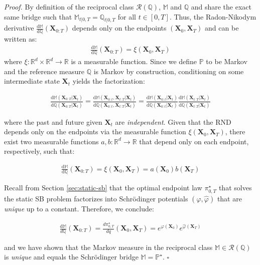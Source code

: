 \documentclass{article}
\begin{document}
\textit{Proof.} By definition of the reciprocal class $\mathcal{R}(\mathbb{Q})$, $\mathbb{M}$ and $\mathbb{Q}$ and share the exact same bridge such that $\mathbb{M}_{t|0,T}=\mathbb{Q}_{t|0,T}$ for all $t\in [0,T]$. Thus, the Radon-Nikodym derivative $\frac{\mathrm{d}\mathbb{M}}{\mathrm{d}\mathbb{Q}}(\boldsymbol{X}_{0:T})$ depends only on the endpoints $(\boldsymbol{X}_0, \boldsymbol{X}_T)$ and can be written as:
\begin{align}
    \frac{\mathrm{d}\mathbb{M}}{\mathrm{d}\mathbb{Q}}(\boldsymbol{X}_{0:T})=\xi(\boldsymbol{X}_0, \boldsymbol{X}_T)
\end{align}
where $\xi:\mathbb{R}^d\times\mathbb{R}^d\to \mathbb{R}$ is a measurable function. Since we define $\mathbb{P}$ to be Markov and the reference measure $\mathbb{Q}$ is Markov by construction, conditioning on some intermediate state $\boldsymbol{X}_t$ yields the factorization:
\begin{small}
\begin{align}
    \frac{\mathrm{d}\mathbb{M}(\boldsymbol{X}_{0:T}|\boldsymbol{X}_t)}{\mathrm{d}\mathbb{Q}(\boldsymbol{X}_{0:T}|\boldsymbol{X}_t)}=\frac{\mathrm{d}\mathbb{M}(\boldsymbol{X}_{0:t}, \boldsymbol{X}_{t:T}|\boldsymbol{X}_t)}{\mathrm{d}\mathbb{Q}(\boldsymbol{X}_{0:t}, \boldsymbol{X}_{t:T}|\boldsymbol{X}_t)}=\frac{\mathrm{d}\mathbb{M}(\boldsymbol{X}_{0:t}|\boldsymbol{X}_t)}{\mathrm{d}\mathbb{Q}(\boldsymbol{X}_{0:t}|\boldsymbol{X}_t)}\frac{\mathrm{d}\mathbb{M}(\boldsymbol{X}_{t:T}|\boldsymbol{X}_t)}{\mathrm{d}\mathbb{Q}(\boldsymbol{X}_{t:T}|\boldsymbol{X}_t)}
\end{align}
\end{small}
where the past and future given $\boldsymbol{X}_t$ are \textit{independent}. Given that the RND depends only on the endpoints via the measurable function $\xi(\boldsymbol{X}_0, \boldsymbol{X}_T)$, there exist two measurable functions $a, b:\mathbb{R}^d\to \mathbb{R}$ that depend only on each endpoint, respectively, such that:
\begin{small}
\begin{align}
    \frac{\mathrm{d}\mathbb{M}}{\mathrm{d}\mathbb{Q}}(\boldsymbol{X}_{0:T})=\xi(\boldsymbol{X}_0, \boldsymbol{X}_T)=a(\boldsymbol{X}_0)b(\boldsymbol{X}_T)
\end{align}
\end{small}
Recall from Section \ref{sec:static-sb} that the optimal endpoint law $\pi^\star_{0,T}$ that solves the static SB problem factorizes into Schrödinger potentials $(\varphi, \hat\varphi)$ that are \textit{unique} up to a constant. Therefore, we conclude:
\begin{small}
\begin{align}
    \frac{\mathrm{d}\mathbb{M}}{d\mathbb{Q}}(\boldsymbol{X}_{0:T})=\frac{d\pi^\star_{0,T}}{dq}(\boldsymbol{X}_0, \boldsymbol{X}_T)=e^{\varphi(\boldsymbol{X}_0)}e^{\hat\varphi(\boldsymbol{X}_T)}
\end{align}
\end{small}
and we have shown that the Markov measure in the reciprocal class $\mathbb{M}\in\mathcal{R}(\mathbb{Q})$ is \textit{unique} and equals the Schrödinger bridge $\mathbb{M}=\mathbb{P}^\star$. \hfill $\square$
\end{document}
